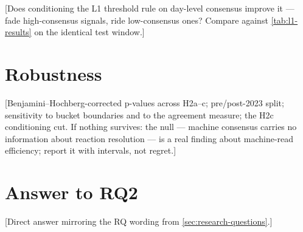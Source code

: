 [Does conditioning the L1 threshold rule on day-level consensus
improve it --- fade high-consensus signals, ride low-consensus ones?
Compare against \cref{tab:l1-results} on the identical test window.]

\section{Robustness}
\label{sec:l2-robustness}

[Benjamini--Hochberg-corrected p-values across H2a--c; pre/post-2023
split; sensitivity to bucket boundaries and to the agreement measure;
the H2c conditioning cut. If nothing survives: the null --- machine
consensus carries no information about reaction resolution --- is a
real finding about machine-read efficiency; report it with intervals,
not regret.]

\section{Answer to RQ2}
\label{sec:l2-answer}

[Direct answer mirroring the RQ wording from \cref{sec:research-questions}.]
